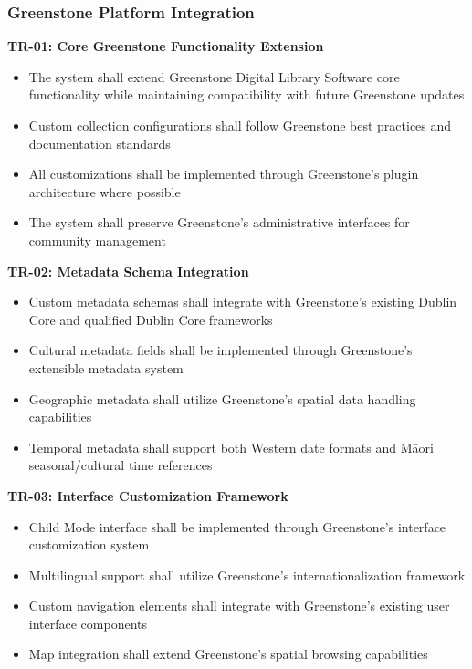 \subsubsection{Greenstone Platform Integration}
\label{subsubsec:greenstone_integration}

\textbf{TR-01: Core Greenstone Functionality Extension}
\begin{itemize}
    \item The system shall extend Greenstone Digital Library Software core functionality while maintaining compatibility with future Greenstone updates
    \item Custom collection configurations shall follow Greenstone best practices and documentation standards
    \item All customizations shall be implemented through Greenstone's plugin architecture where possible
    \item The system shall preserve Greenstone's administrative interfaces for community management
\end{itemize}

\textbf{TR-02: Metadata Schema Integration}
\begin{itemize}
    \item Custom metadata schemas shall integrate with Greenstone's existing Dublin Core and qualified Dublin Core frameworks
    \item Cultural metadata fields shall be implemented through Greenstone's extensible metadata system
    \item Geographic metadata shall utilize Greenstone's spatial data handling capabilities
    \item Temporal metadata shall support both Western date formats and M\=aori seasonal/cultural time references
\end{itemize}

\textbf{TR-03: Interface Customization Framework}
\begin{itemize}
    \item Child Mode interface shall be implemented through Greenstone's interface customization system
    \item Multilingual support shall utilize Greenstone's internationalization framework
    \item Custom navigation elements shall integrate with Greenstone's existing user interface components
    \item Map integration shall extend Greenstone's spatial browsing capabilities
\end{itemize}

